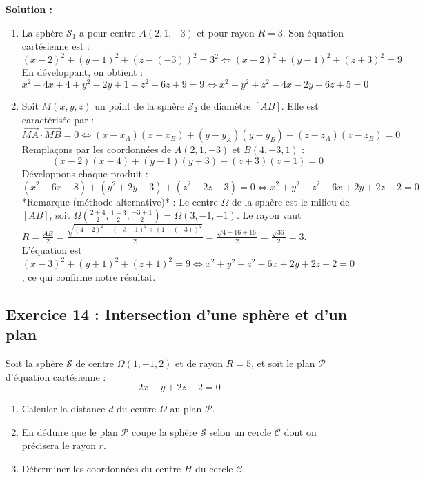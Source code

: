 \textbf{Solution :}
\begin{enumerate}
    \item La sphère $\mathcal{S}_1$ a pour centre $A(2, 1, -3)$ et pour rayon $R = 3$. Son équation cartésienne est :
    \[
    (x - 2)^2 + (y - 1)^2 + (z - (-3))^2 = 3^2 \iff (x - 2)^2 + (y - 1)^2 + (z + 3)^2 = 9
    \]
    En développant, on obtient :
    \[
    x^2 - 4x + 4 + y^2 - 2y + 1 + z^2 + 6z + 9 = 9 \iff x^2 + y^2 + z^2 - 4x - 2y + 6z + 5 = 0
    \]
    
    \item Soit $M(x, y, z)$ un point de la sphère $\mathcal{S}_2$ de diamètre $[AB]$. Elle est caractérisée par :
    \[
    \vec{MA} \cdot \vec{MB} = 0 \iff (x - x_A)(x - x_B) + (y - y_A)(y - y_B) + (z - z_A)(z - z_B) = 0
    \]
    Remplaçons par les coordonnées de $A(2, 1, -3)$ et $B(4, -3, 1)$ :
    \[
    (x - 2)(x - 4) + (y - 1)(y + 3) + (z + 3)(z - 1) = 0
    \]
    Développons chaque produit :
    \[
    (x^2 - 6x + 8) + (y^2 + 2y - 3) + (z^2 + 2z - 3) = 0 \iff x^2 + y^2 + z^2 - 6x + 2y + 2z + 2 = 0
    \]
    *Remarque (méthode alternative)* : Le centre $\Omega$ de la sphère est le milieu de $[AB]$, soit $\Omega\left(\frac{2+4}{2}, \frac{1-3}{2}, \frac{-3+1}{2}\right) = \Omega(3, -1, -1)$.
    Le rayon vaut $R = \frac{AB}{2} = \frac{\sqrt{(4-2)^2 + (-3-1)^2 + (1-(-3))^2}}{2} = \frac{\sqrt{4+16+16}}{2} = \frac{\sqrt{36}}{2} = 3$.
    L'équation est $(x - 3)^2 + (y + 1)^2 + (z + 1)^2 = 9 \iff x^2 + y^2 + z^2 - 6x + 2y + 2z + 2 = 0$, ce qui confirme notre résultat.
\end{enumerate}

\subsection*{Exercice 14 : Intersection d'une sphère et d'un plan}
Soit la sphère $\mathcal{S}$ de centre $\Omega(1, -1, 2)$ et de rayon $R = 5$, et soit le plan $\mathcal{P}$ d'équation cartésienne :
\[
2x - y + 2z + 2 = 0
\]
\begin{enumerate}
    \item Calculer la distance $d$ du centre $\Omega$ au plan $\mathcal{P}$.
    \item En déduire que le plan $\mathcal{P}$ coupe la sphère $\mathcal{S}$ selon un cercle $\mathcal{C}$ dont on précisera le rayon $r$.
    \item Déterminer les coordonnées du centre $H$ du cercle $\mathcal{C}$.
\end{enumerate}

